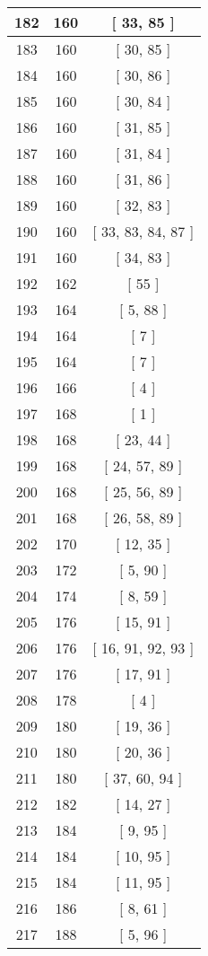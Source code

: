 \begin{center}
\begin{longtable}[H]{|| c c c ||}
\hline
182 & 160 & [ 33, 85 ] \\ 
\hline
183 & 160 & [ 30, 85 ] \\ 
\hline
184 & 160 & [ 30, 86 ] \\ 
\hline
185 & 160 & [ 30, 84 ] \\ 
\hline
186 & 160 & [ 31, 85 ] \\ 
\hline
187 & 160 & [ 31, 84 ] \\ 
\hline
188 & 160 & [ 31, 86 ] \\ 
\hline
189 & 160 & [ 32, 83 ] \\ 
\hline
190 & 160 & [ 33, 83, 84, 87 ] \\ 
\hline
191 & 160 & [ 34, 83 ] \\ 
\hline
192 & 162 & [ 55 ] \\ 
\hline
193 & 164 & [ 5, 88 ] \\ 
\hline
194 & 164 & [ 7 ] \\ 
\hline
195 & 164 & [ 7 ] \\ 
\hline
196 & 166 & [ 4 ] \\ 
\hline
197 & 168 & [ 1 ] \\ 
\hline
198 & 168 & [ 23, 44 ] \\ 
\hline
199 & 168 & [ 24, 57, 89 ] \\ 
\hline
200 & 168 & [ 25, 56, 89 ] \\ 
\hline
201 & 168 & [ 26, 58, 89 ] \\ 
\hline
202 & 170 & [ 12, 35 ] \\ 
\hline
203 & 172 & [ 5, 90 ] \\ 
\hline
204 & 174 & [ 8, 59 ] \\ 
\hline
205 & 176 & [ 15, 91 ] \\ 
\hline
206 & 176 & [ 16, 91, 92, 93 ] \\ 
\hline
207 & 176 & [ 17, 91 ] \\ 
\hline
208 & 178 & [ 4 ] \\ 
\hline
209 & 180 & [ 19, 36 ] \\ 
\hline
210 & 180 & [ 20, 36 ] \\ 
\hline
211 & 180 & [ 37, 60, 94 ] \\ 
\hline
212 & 182 & [ 14, 27 ] \\ 
\hline
213 & 184 & [ 9, 95 ] \\ 
\hline
214 & 184 & [ 10, 95 ] \\ 
\hline
215 & 184 & [ 11, 95 ] \\ 
\hline
216 & 186 & [ 8, 61 ] \\ 
\hline
217 & 188 & [ 5, 96 ] \\ 

\end{longtable}
\end{center}
